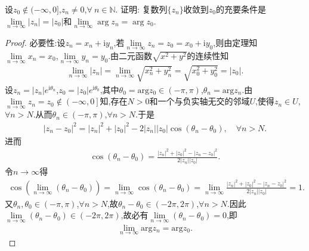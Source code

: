 \documentclass[../../main.tex]{subfiles}%
\begin{document}
\begin{theorem}\label{theorem:模长和辐角的极限等价于复数的极限}
设$z_0 \notin (-\infty,0]$,$z_n \neq 0$,$\forall\ n \in \mathbb{N}$. 证明: 复数列$\{z_n\}$收敛到$z_0$的充要条件是$\lim\limits_{n \to \infty}|z_n| = |z_0|$和$\lim\limits_{n \to \infty}\arg z_n = \arg z_0$.
\end{theorem}
\begin{proof}

{\heiti 必要性:}设$z_n=x_n+\mathrm{i}y_n$,若$\lim\limits_{n\rightarrow \infty}z_n=z_0=x_0+\mathrm{i}y_0$,则由定理知$\lim\limits_{n\rightarrow \infty}x_n=x_0$,$\lim\limits_{n\rightarrow \infty}y_n=y_0$.由二元函数$\sqrt{x^2+y^2}$的连续性知
\begin{align*}
\lim\limits_{n\rightarrow \infty}\left| z_n \right|=\lim\limits_{n\rightarrow \infty}\sqrt{x_{n}^{2}+y_{n}^{2}}=\sqrt{x_{0}^{2}+y_{0}^{2}}=\left| z_0 \right|.
\end{align*}
设$z_n=\left| z_n \right|e^{\mathrm{i}\theta _n}$,$z_0=\left| z_0 \right|e^{\mathrm{i}\theta _0}$,其中$\theta _0=\mathrm{arg}z_0\in \left( -\pi ,\pi \right)$,$\theta _n=\mathrm{arg}z_n$.由$\lim\limits_{n\rightarrow \infty}z_n=z_0\notin \left( -\infty ,0 \right]$知,存在$N>0$和一个与负实轴无交的邻域$U$,使得$z_n\in U$,$\forall n>N$.从而$\theta _n\in \left( -\pi ,\pi \right)$,$\forall n>N$.于是
\begin{align*}
\left| z_n-z_0 \right|^2=\left| z_n \right|^2+\left| z_0 \right|^2-2\left| z_n \right|\left| z_0 \right|\cos \left( \theta _n-\theta _0 \right),\quad \forall n>N.
\end{align*}
进而
\begin{align*}
\cos \left( \theta _n-\theta _0 \right) =\frac{\left| z_n \right|^2+\left| z_0 \right|^2-\left| z_n-z_0 \right|^2}{2\left| z_n \right|\left| z_0 \right|}.
\end{align*}
令$n\rightarrow \infty$得
\begin{align*}
\cos \left( \lim\limits_{n\rightarrow \infty}\left( \theta _n-\theta _0 \right) \right) =\lim\limits_{n\rightarrow \infty}\cos \left( \theta _n-\theta _0 \right) =\lim\limits_{n\rightarrow \infty}\frac{\left| z_n \right|^2+\left| z_0 \right|^2-\left| z_n-z_0 \right|^2}{2\left| z_n \right|\left| z_0 \right|}=1.
\end{align*}
又$\theta _n,\theta _0\in \left( -\pi ,\pi \right)$,$\forall n>N$,故$\theta _n-\theta _0\in \left( -2\pi ,2\pi \right)$,$\forall n>N$.因此$\lim\limits_{n\rightarrow \infty}\left( \theta _n-\theta _0 \right) \in \left( -2\pi ,2\pi \right)$,故必有$\lim\limits_{n\rightarrow \infty}\left( \theta _n-\theta _0 \right) =0$,即
\begin{align*}
\lim\limits_{n\rightarrow \infty}\mathrm{arg}z_n=\mathrm{arg}z_0.
\end{align*}


\end{proof}
\end{document}
